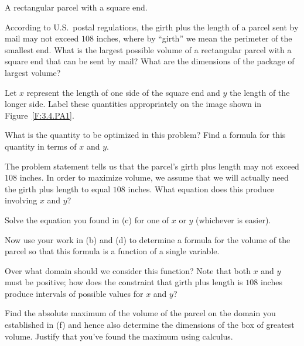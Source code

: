 \begin{marginfigure}[2cm]
\caption{A rectangular parcel with a square end.} \label{F:3.4.PA1}
\end{marginfigure}

\begin{pa} \label{PA:3.4}
According to U.S.~postal regulations, the girth plus the length of a parcel sent by mail may not exceed $108$ inches, where by ``girth'' we mean the perimeter of the smallest end.  What is the largest possible volume of a rectangular parcel with a square end that can be sent by mail?  What are the dimensions of the package of largest volume? 

\ba
	\item Let $x$ represent the length of one side of the square end and $y$ the length of the longer side.  Label these quantities appropriately on the image shown in Figure~\ref{F:3.4.PA1}.
	\item What is the quantity to be optimized in this problem?  Find a formula for this quantity in terms of $x$ and $y$.
	\item The problem statement tells us that the parcel's girth plus length may not exceed $108$ inches.  In order to maximize volume, we assume that we will actually need the girth plus length to equal $108$ inches.  What equation does this produce involving $x$ and $y$?
	\item Solve the equation you found in (c) for one of $x$ or $y$ (whichever is easier).
	\item Now use your work in (b) and (d) to determine a formula for the volume of the parcel so that this formula is a function of a single variable.
	\item Over what domain should we consider this function?  Note that both $x$ and $y$ must be positive; how does the constraint that girth plus length is $108$ inches produce intervals of possible values for $x$ and $y$?
	\item Find the absolute maximum of the volume of the parcel on the domain you established in (f) and hence also determine the dimensions of the box of greatest volume.  Justify that you've found the maximum using calculus.
\ea
\end{pa} 
\afterpa
